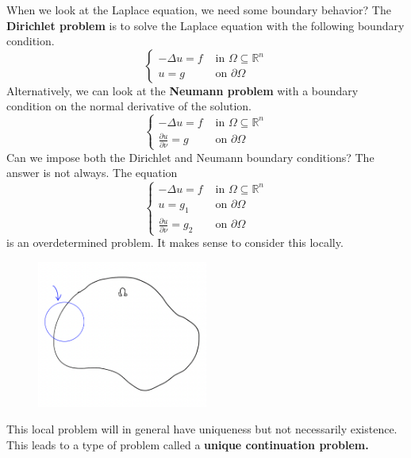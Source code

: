 When we look at the Laplace equation, we need some boundary behavior? The \textbf{Dirichlet problem} is to solve the Laplace equation with the following boundary condition.
$$
\begin{cases}-\Delta u=f & \text { in } \Omega \subseteq \mathbb{R}^{n} \\ u=g & \text { on } \partial \Omega\end{cases}
$$
Alternatively, we can look at the \textbf{Neumann problem} with a boundary condition on the normal derivative of the solution.
$$
\begin{cases}-\Delta u=f & \text { in } \Omega \subseteq \mathbb{R}^{n} \\ \frac{\partial u}{\partial \nu}=g & \text { on } \partial \Omega\end{cases}
$$
Can we impose both the Dirichlet and Neumann boundary conditions? The answer is not always. The equation
$$
\begin{cases}-\Delta u=f & \text { in } \Omega \subseteq \mathbb{R}^{n} \\ u=g_1 & \text { on } \partial \Omega \\ \frac{\partial u}{\partial \nu}=g_2 & \text { on } \partial \Omega\end{cases}
$$
is an overdetermined problem. It makes sense to consider this locally.
\begin{figure}[H]
    \centering
    \includegraphics[width=0.5\textwidth]{Pics/23-1.png}
\end{figure}
This local problem will in general have uniqueness but not necessarily existence. This leads to a type of problem called a \textbf{unique continuation problem.}

